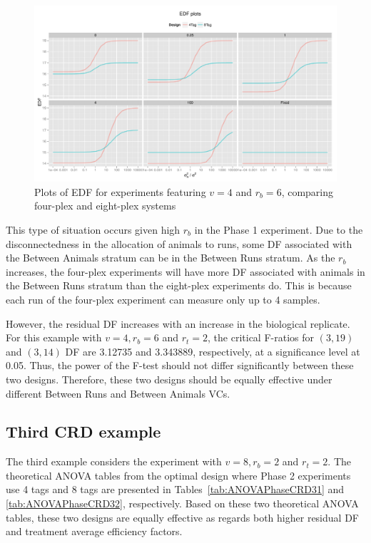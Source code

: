 \documentclass[12pt,a4paper]{article}
\begin{document}
\begin{figure}[ht]
\centering
\includegraphics[width=1 \textwidth]{Graph/CRD462Tag4vsTag8.pdf}
\caption{Plots of EDF for experiments featuring $v = 4$ and $r_b = 6$, comparing four-plex and eight-plex systems}
\label{fig:compare44CRD}
\end{figure}

This type of situation occurs given high $r_b$ in the Phase 1 experiment. Due to the disconnectedness in the allocation of animals to runs, some DF associated with the Between Animals stratum can be in the Between Runs stratum. As the $r_b$ increases, the four-plex experiments will have more DF associated with animals in the Between Runs stratum than the eight-plex experiments do. This is because each run of the four-plex experiment can measure only up to 4 samples. 

However, the residual DF increases with an increase in the biological replicate. For this example with $v = 4, r_b = 6$ and $r_t = 2$, the critical F-ratios for $(3,19)$ and $(3,14)$ DF are 3.12735 and 3.343889, respectively, at a significance level at 0.05. Thus, the power of the F-test should not differ significantly between these two designs. Therefore, these two designs should be equally effective under different Between Runs and Between Animals VCs.

\subsection{Third CRD example}
The third example considers the experiment with $v = 8, r_b = 2$ and $r_t = 2$. The theoretical ANOVA tables from the optimal design where Phase 2 experiments use 4 tags and 8 tags are presented in Tables~\ref{tab:ANOVAPhaseCRD31} and \ref{tab:ANOVAPhaseCRD32}, respectively. 
Based on these two theoretical ANOVA tables, these two designs are equally effective as regards both higher residual DF and treatment average efficiency factors. 
\end{document}
